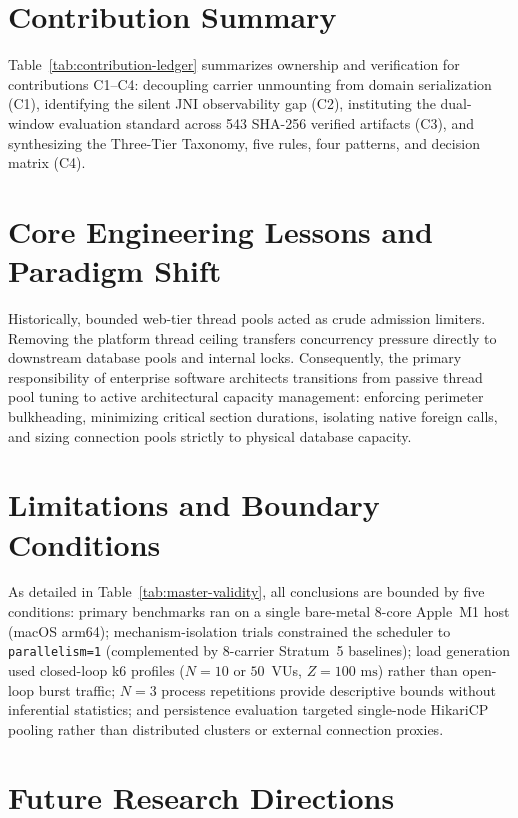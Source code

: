 \section{Contribution Summary}
\label{sec:conclusion-contributions}

Table~\ref{tab:contribution-ledger} summarizes ownership and verification for contributions C1--C4: decoupling carrier unmounting from domain serialization (C1), identifying the silent JNI observability gap (C2), instituting the dual-window evaluation standard across 543 SHA-256 verified artifacts (C3), and synthesizing the Three-Tier Taxonomy, five rules, four patterns, and decision matrix (C4).

\section{Core Engineering Lessons and Paradigm Shift}
\label{sec:conclusion-lessons}

Historically, bounded web-tier thread pools acted as crude admission limiters. Removing the platform thread ceiling transfers concurrency pressure directly to downstream database pools and internal locks. Consequently, the primary responsibility of enterprise software architects transitions from passive thread pool tuning to active architectural capacity management: enforcing perimeter bulkheading, minimizing critical section durations, isolating native foreign calls, and sizing connection pools strictly to physical database capacity.

\section{Limitations and Boundary Conditions}
\label{sec:conclusion-limitations}

As detailed in Table~\ref{tab:master-validity}, all conclusions are bounded by five conditions: primary benchmarks ran on a single bare-metal 8-core Apple~M1 host (macOS arm64); mechanism-isolation trials constrained the scheduler to \texttt{parallelism=1} (complemented by 8-carrier Stratum~5 baselines); load generation used closed-loop k6 profiles ($N=10$ or $50$~VUs, $Z=100\text{ ms}$) rather than open-loop burst traffic; $N=3$ process repetitions provide descriptive bounds without inferential statistics; and persistence evaluation targeted single-node HikariCP pooling rather than distributed clusters or external connection proxies.

\section{Future Research Directions}
\label{sec:conclusion-future-work}

